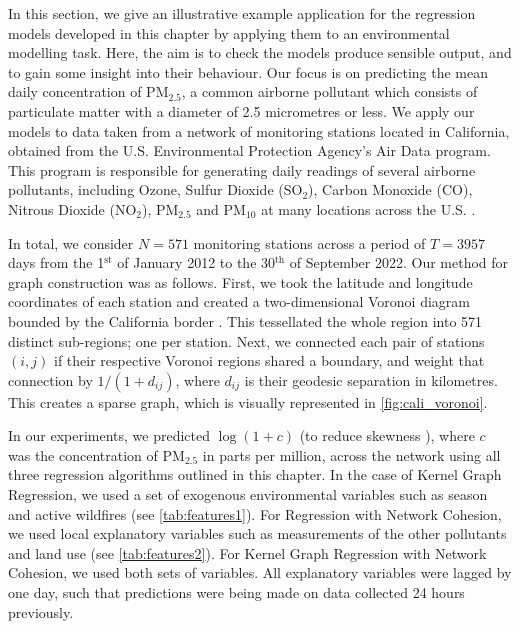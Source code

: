 \label{sec:pollutant_monitoring}

In this section, we give an illustrative example application for the regression models developed in this chapter by applying them to an environmental modelling task. Here, the aim is to check the models produce sensible output, and to gain some insight into their behaviour. Our focus is on predicting the mean daily concentration of PM$_{2.5}$, a common airborne pollutant which consists of particulate matter with a diameter of 2.5 micrometres or less. We apply our models to data taken from a network of monitoring stations located in California, obtained from the U.S. Environmental Protection Agency's Air Data program. This program is responsible for generating daily readings of several airborne pollutants, including Ozone, Sulfur Dioxide (SO$_2$), Carbon Monoxide (CO), Nitrous Dioxide (NO$_2$), PM$_{2.5}$ and PM$_{10}$ at many locations across the U.S. \citep{EPA2023}.  

In total, we consider $N=571$ monitoring stations across a period of $T=3957$ days from the 1$^\text{st}$ of January 2012 to the 30$^\text{th}$ of September 2022. Our method for graph construction was as follows. First, we took the latitude and longitude coordinates of each station and created a two-dimensional Voronoi diagram bounded by the California border \citep{Fortune1986}. This tessellated the whole region into 571 distinct sub-regions; one per station. Next, we connected each pair of stations $(i, j)$ if their respective Voronoi regions shared a boundary, and weight that connection by  $1 / (1 + d_{ij})$, where $d_{ij}$ is their geodesic separation in kilometres. This creates a sparse graph, which is visually represented in \cref{fig:cali_voronoi}. 

In our experiments, we predicted $\log(1+c)$ (to reduce skewness \citep{West2022}), where $c$ was the concentration of PM$_{2.5}$ in parts per million, across the network using all three regression algorithms outlined in this chapter. In the case of Kernel Graph Regression, we used a set of exogenous environmental variables such as season and active wildfires (see \cref{tab:features1}). For Regression with Network Cohesion, we used local explanatory variables such as measurements of the other pollutants and land use (see \cref{tab:features2}). For Kernel Graph Regression with Network Cohesion, we used both sets of variables. All explanatory variables were lagged by one day, such that predictions were being made on data collected 24 hours previously. 


